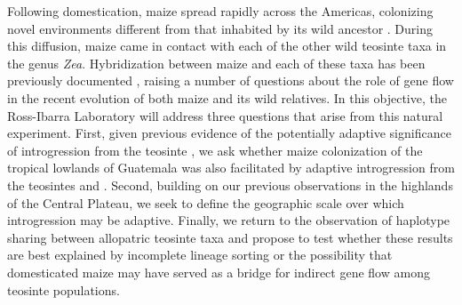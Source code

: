 



Following domestication, maize spread rapidly across the Americas, colonizing novel environments different from that inhabited by its wild ancestor \zp. 
During this diffusion, maize came in contact with each of the other wild teosinte taxa in the genus \emph{Zea}.  
Hybridization between maize and each of these taxa has been previously documented \citep[see][for a review]{doebley1990molecular}, raising a number of questions about the role of gene flow in the recent evolution of both maize and its wild relatives.
In this objective, the Ross-Ibarra Laboratory  will address three questions that arise from this natural experiment.  
First, given previous evidence of the potentially adaptive significance of introgression from the teosinte \zm, we ask whether maize colonization of the tropical lowlands of Guatemala was also facilitated by adaptive introgression from the teosintes \zl{} and \zh.
Second, building on our previous observations in the highlands of the Central Plateau, we seek to define the geographic scale over which introgression may be adaptive.
Finally, we return to the observation of haplotype sharing between allopatric teosinte taxa \citep{Ross-Ibarra2009a} and propose to test whether these results are best explained by incomplete lineage sorting or the possibility that domesticated maize may have served as a bridge for indirect gene flow among teosinte populations. 

